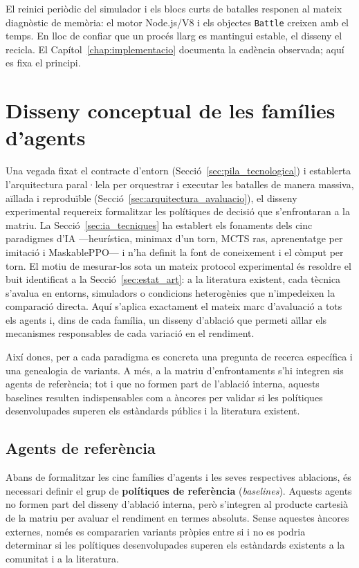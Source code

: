 El reinici periòdic del simulador i els blocs curts de batalles responen al mateix diagnòstic de memòria: el motor Node.js/V8 i els objectes \texttt{Battle} creixen amb el temps. En lloc de confiar que un procés llarg es mantingui estable, el disseny el recicla. El Capítol~\ref{chap:implementacio} documenta la cadència observada; aquí es fixa el principi.

\section{Disseny conceptual de les famílies d'agents}
\label{sec:disseny_agents}

Una vegada fixat el contracte d'entorn (Secció~\ref{sec:pila_tecnologica}) i establerta l'arquitectura paral·lela per orquestrar i executar les batalles de manera massiva, aïllada i reproduïble (Secció~\ref{sec:arquitectura_avaluacio}), el disseny experimental requereix formalitzar les polítiques de decisió que s'enfrontaran a la matriu. La Secció~\ref{sec:ia_tecniques} ha establert els fonaments dels cinc paradigmes d'IA ---heurística, minimax d'un torn, MCTS ras, aprenentatge per imitació i MaskablePPO--- i n'ha definit la font de coneixement i el còmput per torn. El motiu de mesurar-los sota un mateix protocol experimental és resoldre el buit identificat a la Secció~\ref{sec:estat_art}: a la literatura existent, cada tècnica s'avalua en entorns, simuladors o condicions heterogènies que n'impedeixen la comparació directa. Aquí s'aplica exactament el mateix marc d'avaluació a tots els agents i, dins de cada família, un disseny d'ablació que permeti aïllar els mecanismes responsables de cada variació en el rendiment.

Així doncs, per a cada paradigma es concreta una pregunta de recerca específica i una genealogia de variants. A més, a la matriu d'enfrontaments s'hi integren sis agents de referència; tot i que no formen part de l'ablació interna, aquests baselines resulten indispensables com a àncores per validar si les polítiques desenvolupades superen els estàndards públics i la literatura existent.

\subsection{Agents de referència}

Abans de formalitzar les cinc famílies d'agents i les seves respectives ablacions, és necessari definir el grup de \textbf{polítiques de referència} (\emph{baselines}). Aquests agents no formen part del disseny d'ablació interna, però s'integren al producte cartesià de la matriu per avaluar el rendiment en termes absoluts. Sense aquestes àncores externes, només es compararien variants pròpies entre si i no es podria determinar si les polítiques desenvolupades superen els estàndards existents a la comunitat i a la literatura.

